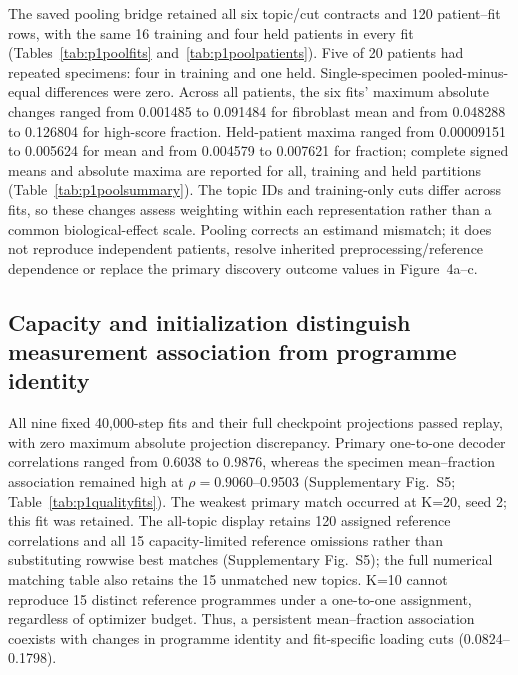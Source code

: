 \documentclass[10pt,a4paper]{article}
\begin{document}
The saved pooling bridge retained all six topic/cut contracts and 120 patient--fit rows, with the same 16 training and four held patients in every fit (Tables~\ref{tab:p1poolfits} and~\ref{tab:p1poolpatients}). Five of 20 patients had repeated specimens: four in training and one held. Single-specimen pooled-minus-equal differences were zero. Across all patients, the six fits' maximum absolute changes ranged from 0.001485 to 0.091484 for fibroblast mean and from 0.048288 to 0.126804 for high-score fraction. Held-patient maxima ranged from 0.00009151 to 0.005624 for mean and from 0.004579 to 0.007621 for fraction; complete signed means and absolute maxima are reported for all, training and held partitions (Table~\ref{tab:p1poolsummary}). The topic IDs and training-only cuts differ across fits, so these changes assess weighting within each representation rather than a common biological-effect scale. Pooling corrects an estimand mismatch; it does not reproduce independent patients, resolve inherited preprocessing/reference dependence or replace the primary discovery outcome values in Figure~4a--c.

\subsection{Capacity and initialization distinguish measurement association from programme identity}

All nine fixed 40,000-step fits and their full checkpoint projections passed replay, with zero maximum absolute projection discrepancy. Primary one-to-one decoder correlations ranged from 0.6038 to 0.9876, whereas the specimen mean--fraction association remained high at $\rho=0.9060$--0.9503 (Supplementary Fig.~S5\label{call:p1f10}; Table~\ref{tab:p1qualityfits}). The weakest primary match occurred at K=20, seed 2; this fit was retained. The all-topic display retains 120 assigned reference correlations and all 15 capacity-limited reference omissions rather than substituting rowwise best matches (Supplementary Fig.~S5); the full numerical matching table also retains the 15 unmatched new topics. K=10 cannot reproduce 15 distinct reference programmes under a one-to-one assignment, regardless of optimizer budget. Thus, a persistent mean--fraction association coexists with changes in programme identity and fit-specific loading cuts (0.0824--0.1798).
\end{document}
